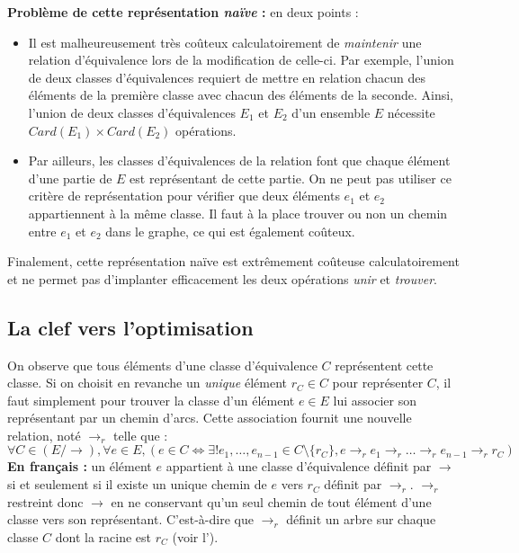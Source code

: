 \documentclass[../../../main.tex]{subfiles}
\begin{document}
\textbf{Problème de cette représentation \textit{naïve} :} en deux points :
\begin{itemize}
	\item Il est malheureusement très coûteux calculatoirement de \textit{maintenir} une relation d'équivalence lors de la modification de celle-ci. Par exemple, l'union de deux classes d'équivalences requiert de mettre en relation chacun des éléments de la première classe avec chacun des éléments de la seconde. Ainsi, l'union de deux classes d'équivalences $E_1$ et $E_2$ d'un ensemble $E$ nécessite $Card(E_1)\times Card(E_2)$ opérations.
	\item Par ailleurs, les classes d'équivalences de la relation font que chaque élément d'une partie de $E$ est représentant de cette partie. On ne peut pas utiliser ce critère de représentation pour vérifier que deux éléments $e_1$ et $e_2$ appartiennent à la même classe. Il faut à la place trouver ou non un chemin entre $e_1$ et $e_2$ dans le graphe, ce qui est également coûteux.
\end{itemize}
Finalement, cette représentation naïve est extrêmement coûteuse calculatoirement et ne permet pas d'implanter efficacement les deux opérations \textit{unir} et \textit{trouver}.
\subsection{La clef vers l'optimisation}
On observe que tous éléments d'une classe d'équivalence $C$ représentent cette classe. Si on choisit en revanche un \textit{unique} élément $r_C\in C$ pour représenter $C$, il faut simplement pour trouver la classe d'un élément $e\in E$ lui associer son représentant par un chemin d'arcs. Cette association fournit une nouvelle relation, noté $\rightarrow_r$ telle que :
$$\forall C\in (E/\rightarrow), \forall e\in E, \left(e\in C\Leftrightarrow \exists! e_1, \dots, e_{n-1}\in C\setminus\{r_C\}, e\rightarrow_r e_1 \rightarrow_r\dots \rightarrow_r e_{n-1}\rightarrow_r  r_C\right)$$
\textbf{En français :} un élément $e$ appartient à une classe d'équivalence définit par $\rightarrow$ si et seulement si il existe un unique chemin de $e$ vers $r_C$ définit par $\rightarrow_r$. $\rightarrow_r$ restreint donc $\rightarrow$ en ne conservant qu'un seul chemin de tout élément d'une classe vers son représentant. C'est-à-dire que $\rightarrow_r$ définit un arbre sur chaque classe $C$ dont la racine est $r_C$ (voir l').
\end{document}
